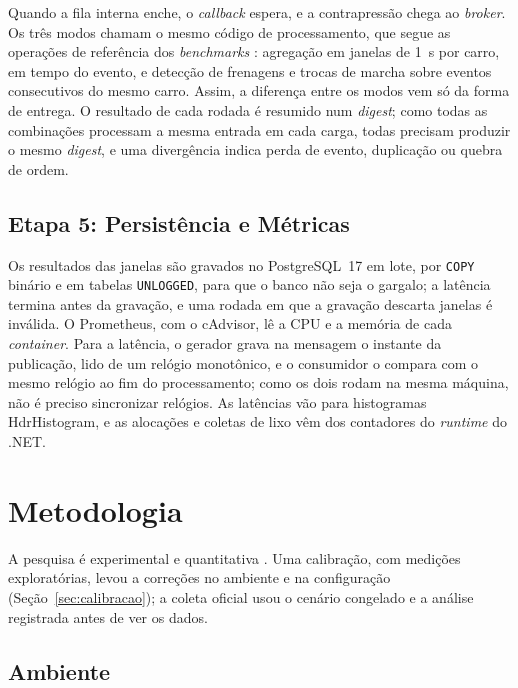 \documentclass[12pt]{article}
\begin{document}
Quando a fila interna enche, o \textit{callback} espera, e a contrapressão chega ao \textit{broker}. Os três
modos chamam o mesmo código de processamento, que segue as operações de referência dos
\textit{benchmarks} \cite{arasu:2004,mutschler:2013}: agregação em janelas de 1~s por carro, em
tempo do evento, e detecção de frenagens e trocas de marcha sobre eventos consecutivos do
mesmo carro. Assim, a diferença entre os modos vem só da forma de entrega. O resultado de
cada rodada é resumido num \textit{digest}; como todas as combinações processam a mesma
entrada em cada carga, todas precisam produzir o mesmo \textit{digest}, e uma divergência indica
perda de evento, duplicação ou quebra de ordem.

\subsection{Etapa 5: Persistência e Métricas}
\label{sec:coleta}

Os resultados das janelas são gravados no PostgreSQL~17 em lote, por \texttt{COPY}
binário e em tabelas \texttt{UNLOGGED}, para que o banco não seja o gargalo; a latência
termina antes da gravação, e uma rodada em que a gravação descarta janelas é inválida. O
Prometheus, com o cAdvisor, lê a CPU e a memória de cada \textit{container}. Para a latência, o
gerador grava na mensagem o instante da publicação, lido de um relógio monotônico, e o
consumidor o compara com o mesmo relógio ao fim do processamento; como os dois rodam na
mesma máquina, não é preciso sincronizar relógios. As latências vão para histogramas
HdrHistogram, e as alocações e coletas de lixo vêm dos contadores do \textit{runtime} do .NET.


\section{Metodologia}
\label{sec:metodologia}

A pesquisa é experimental e quantitativa \cite{jain:1991}. Uma calibração, com medições
exploratórias, levou a correções no ambiente e na configuração
(Seção~\ref{sec:calibracao}); a coleta oficial usou o cenário congelado e a análise
registrada antes de ver os dados.

\subsection{Ambiente}
\end{document}
